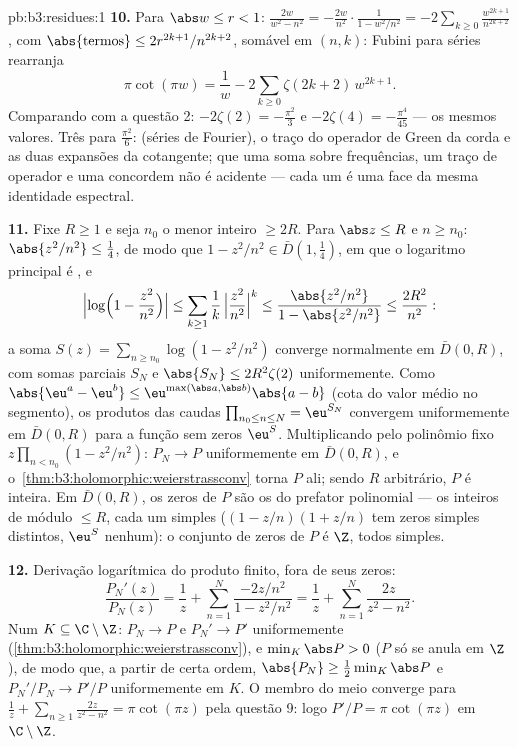 \begin{solution}{pb:b3:residues:1}
\textbf{10.} Para $\abs w \leq r < 1$: $\frac{2w}{w^2 - n^2} =
-\frac{2w}{n^2}\cdot\frac1{1 - w^2/n^2} =
-2\sum_{k\geq0}\frac{w^{2k+1}}{n^{2k+2}}$, com
$\abs{\text{termos}} \leq 2r^{2k+1}/n^{2k+2}$, somável em
$(n, k)$: Fubini para séries rearranja
\[
\pi\cot(\pi w) = \frac1w -
2\sum_{k\geq0}\zeta(2k+2)\,w^{2k+1} .
\]
Comparando com a questão 2: $-2\zeta(2) = -\frac{\pi^2}3$ e
$-2\zeta(4) = -\frac{\pi^4}{45}$ --- os mesmos valores. Três
 para $\frac{\pi^2}6$:  (séries de Fourier), o
traço do operador de Green da corda e as duas expansões da
cotangente; que uma soma sobre frequências, um traço de operador
e uma  concordem não é acidente --- cada um é uma
face da mesma identidade espectral.

\textbf{11.} Fixe $R \geq 1$ e seja $n_0$ o menor
inteiro $\geq 2R$. Para $\abs z \leq R$ e $n \geq n_0$:
$\abs{z^2/n^2} \leq \frac14$, de modo que $1 - z^2/n^2 \in
\bar D(1, \frac14)$, em que o logaritmo principal é
, e
\[
\Bigl|\log\Bigl(1 - \frac{z^2}{n^2}\Bigr)\Bigr|
\leq \sum_{k\geq1}\frac1k\,\Bigl|\frac{z^2}{n^2}\Bigr|^k
\leq \frac{\abs{z^2/n^2}}{1 - \abs{z^2/n^2}}
\leq \frac{2R^2}{n^2} :
\]
a soma $S(z) = \sum_{n\geq n_0}\log(1 - z^2/n^2)$ converge
normalmente em $\bar D(0, R)$, com somas parciais 
$S_N$ e $\abs{S_N} \leq 2R^2\zeta(2)$ uniformemente. Como
$\abs{\eu^a - \eu^b} \leq
\eu^{\max(\abs a,\abs b)}\abs{a - b}$ (cota do valor médio no
segmento), os produtos das caudas $\prod_{n_0\leq n\leq N} =
\eu^{S_N}$ convergem uniformemente em $\bar D(0, R)$ para a
função sem zeros $\eu^S$. Multiplicando pelo polinômio fixo
$z\prod_{n<n_0}(1 - z^2/n^2)$: $P_N \to P$ uniformemente em
$\bar D(0, R)$, e o~\cref{thm:b3:holomorphic:weierstrassconv} torna $P$
 ali; sendo $R$ arbitrário, $P$ é inteira. Em
$\bar D(0, R)$, os zeros de $P$ são os do prefator
polinomial --- os inteiros de módulo $\leq R$, cada um simples
($(1 - z/n)(1 + z/n)$ tem zeros simples distintos, $\eu^S$
nenhum): o conjunto de zeros de $P$ é $\Z$, todos simples.

\textbf{12.} Derivação logarítmica do produto finito,
fora de seus zeros:
\[
\frac{P_N'(z)}{P_N(z)} = \frac1z +
\sum_{n=1}^{N}\frac{-2z/n^2}{1 - z^2/n^2}
= \frac1z + \sum_{n=1}^{N}\frac{2z}{z^2 - n^2} .
\]
Num  $K \subseteq \C\setminus\Z$: $P_N \to P$ e
$P_N' \to P'$ uniformemente
(\cref{thm:b3:holomorphic:weierstrassconv}), e $\min_K
\abs P > 0$ ($P$ só se anula em $\Z$), de modo que, a partir de certa ordem,
$\abs{P_N} \geq \frac12\min_K\abs P$ e $P_N'/P_N \to
P'/P$ uniformemente em $K$. O membro do meio converge para
$\frac1z + \sum_{n\geq1}\frac{2z}{z^2-n^2} = \pi\cot(\pi z)$
pela questão 9: logo $P'/P = \pi\cot(\pi z)$ em
$\C\setminus\Z$.


\end{solution}
